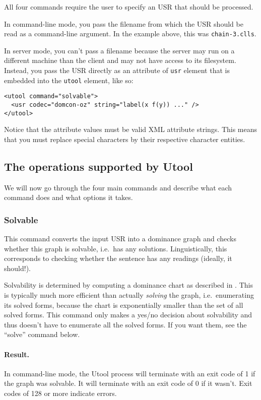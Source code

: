 All four commands require the user to specify an USR that should be
processed.

In command-line mode, you pass the filename from which the USR should
be read as a command-line argument. In the example above, this was
\verb?chain-3.clls?.

In server mode, you can't pass a filename because the server may run
on a different machine than the client and may not have access to its
filesystem. Instead, you pass the USR directly as an attribute of
\verb?usr? element that is embedded into the \verb?utool? element,
like so:

\begin{verbatim}
<utool command="solvable">
  <usr codec="domcon-oz" string="label(x f(y)) ..." />
</utool>
\end{verbatim}

Notice that the attribute values must be valid XML attribute
strings. This means that you must replace special characters by
their respective character entities.




\subsection{The operations supported by Utool}

We will now go through the four main commands and describe what each
command does and what options it takes.


\subsubsection{Solvable}

This command converts the input USR into a dominance graph and checks
whether this graph is solvable, i.e.\ has any
solutions. Linguistically, this corresponds to checking whether the
sentence has any readings (ideally, it should!).

Solvability is determined by computing a dominance chart as described
in \cite{KolTha05b}. This is typically much more efficient than
actually \emph{solving} the graph, i.e.\ enumerating its solved forms,
because the chart is exponentially smaller than the set of all solved
forms. This command only makes a yes/no decision about solvability and
thus doesn't have to enumerate all the solved forms. If you want them,
see the ``solve'' command below.


\paragraph{Result.}
In command-line mode, the Utool process will terminate with an exit
code of 1 if the graph was solvable. It will terminate with an exit
code of 0 if it wasn't. Exit codes of 128 or more indicate errors.

